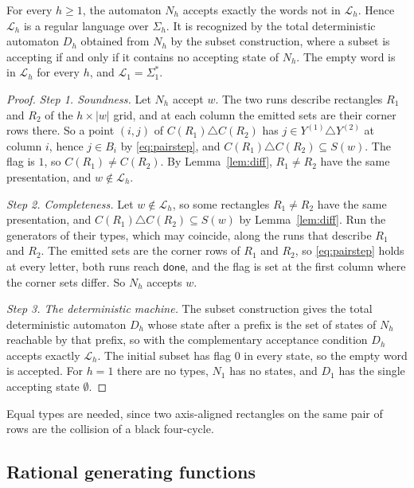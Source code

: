 \begin{theorem}[regularity]\label{thm:regular}
For every $h\ge1$, the automaton $N_h$ accepts exactly the words not in $\mathcal L_h$. Hence $\mathcal L_h$ is a regular language over $\Sigma_h$. It is recognized by the total deterministic automaton $D_h$ obtained from $N_h$ by the subset construction, where a subset is accepting if and only if it contains no accepting state of $N_h$. The empty word is in $\mathcal L_h$ for every $h$, and $\mathcal L_1=\Sigma_1^*$.
\end{theorem}

\begin{proof}
\emph{Step 1. Soundness.} Let $N_h$ accept $w$. The two runs describe rectangles $R_1$ and $R_2$ of the $h\times|w|$ grid, and at each column the emitted sets are their corner rows there. So a point $(i,j)$ of $C(R_1)\triangle C(R_2)$ has $j\in Y^{(1)}\triangle Y^{(2)}$ at column $i$, hence $j\in B_i$ by \eqref{eq:pairstep}, and $C(R_1)\triangle C(R_2)\subseteq S(w)$. The flag is $1$, so $C(R_1)\ne C(R_2)$. By Lemma~\ref{lem:diff}, $R_1\ne R_2$ have the same presentation, and $w\notin\mathcal L_h$.

\emph{Step 2. Completeness.} Let $w\notin\mathcal L_h$, so some rectangles $R_1\ne R_2$ have the same presentation, and $C(R_1)\triangle C(R_2)\subseteq S(w)$ by Lemma~\ref{lem:diff}. Run the generators of their types, which may coincide, along the runs that describe $R_1$ and $R_2$. The emitted sets are the corner rows of $R_1$ and $R_2$, so \eqref{eq:pairstep} holds at every letter, both runs reach $\mathsf{done}$, and the flag is set at the first column where the corner sets differ. So $N_h$ accepts $w$.

\emph{Step 3. The deterministic machine.} The subset construction gives the total deterministic automaton $D_h$ whose state after a prefix is the set of states of $N_h$ reachable by that prefix, so with the complementary acceptance condition $D_h$ accepts exactly $\mathcal L_h$. The initial subset has flag $0$ in every state, so the empty word is accepted. For $h=1$ there are no types, $N_1$ has no states, and $D_1$ has the single accepting state $\emptyset$.
\end{proof}

Equal types are needed, since two axis-aligned rectangles on the same pair of rows are the collision of a black four-cycle.

\subsection{Rational generating functions}

